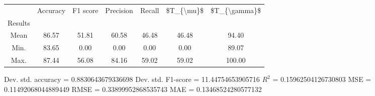 \begin{tabular}{|c|c|c|c|c|c|c|}
\toprule
{} &  Accuracy &  F1 score &  Precision &  Recall &  \$T\_\{\textbackslash mu\}\$ &  \$T\_\{\textbackslash gamma\}\$ \\
Results &           &           &            &         &            &               \\
\hline
Mean    &     86.57 &     51.81 &      60.58 &   46.48 &      46.48 &         94.40 \\
Min.    &     83.65 &      0.00 &       0.00 &    0.00 &       0.00 &         89.07 \\
Max.    &     87.44 &     56.08 &      84.16 &   59.02 &      59.02 &        100.00 \\
\bottomrule
\end{tabular}

 Dev. std. accuracy = 0.8830643679336698
 Dev. std. F1-score = 11.44754653905716
 $R^2$ = 0.15962504126730803
 MSE = 0.11492068044889449
 RMSE = 0.33899952868535743
 MAE = 0.13468524280577132